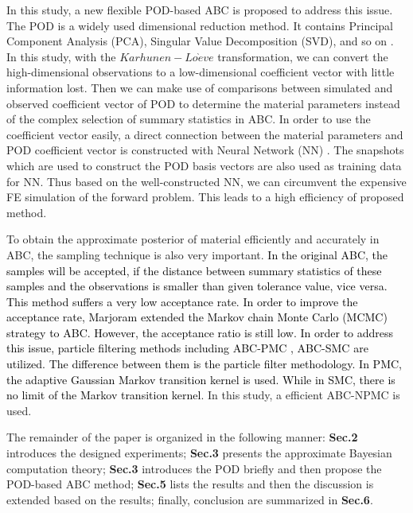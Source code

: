 \documentclass[review]{elsarticle}
\begin{document}
In this study, a new flexible POD-based ABC is proposed to address this issue. The POD \cite{ostrowski2005estimation} is a widely used dimensional reduction method. It contains Principal Component Analysis (PCA), Singular Value Decomposition (SVD), and so on \cite{liang2002proper,wu2003note}. In this study, with the $Karhunen-Lo\grave{e}ve$ transformation, we can convert the high-dimensional observations to a low-dimensional coefficient vector with little information lost. Then we can make use of comparisons between simulated and observed coefficient vector of POD to determine the material parameters instead of the complex selection of summary statistics in ABC. In order to use the coefficient vector easily, a direct connection between the material parameters and POD coefficient vector is constructed with Neural Network (NN) \cite{bishop2006pattern}. The snapshots which are used to construct the POD basis vectors are also used as training data for NN. Thus based on the well-constructed NN, we can circumvent the expensive FE simulation of the forward problem. This leads to a high efficiency of proposed method.

To obtain the approximate posterior of material efficiently and accurately in ABC, the sampling technique is also very important.
\textcolor{black}{In the original ABC, the samples will be accepted, if the distance between summary statistics of these samples and the observations is smaller than given tolerance value, vice versa. This method suffers a very low acceptance rate. In order to improve the acceptance rate, Marjoram\cite{marjoram2003markov} extended the Markov chain Monte Carlo (MCMC) strategy to ABC. However, the acceptance ratio is still low. In order to address this issue, particle filtering methods including ABC-PMC \cite{beaumont2009adaptive,beaumont2010approximate}, ABC-SMC \cite{toni2009approximate} are utilized. The difference between them is the particle filter methodology. In PMC, the adaptive Gaussian Markov transition kernel is used. While in SMC, there is no limit of the Markov transition kernel}. In this study, a efficient ABC-NPMC \cite{zeng2017} is used. 

The remainder of the paper is organized in the following manner: \textbf{Sec.2} introduces the designed experiments; \textbf{Sec.3} presents the approximate Bayesian computation theory; \textbf{Sec.3} introduces the POD briefly and then  propose the POD-based ABC method; \textbf{Sec.5} lists the results and then the discussion is extended based on the results; finally, conclusion are summarized in \textbf{Sec.6}.
\end{document}
